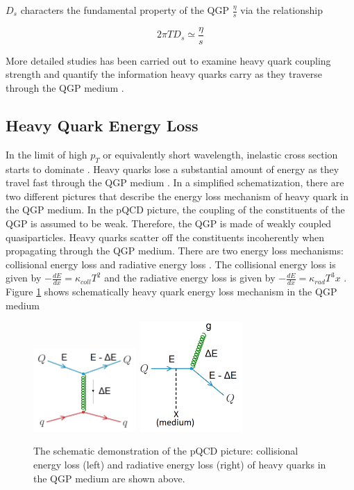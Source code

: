 $D_s$ characters the fundamental property of the QGP $\frac{\eta}{s}$ via the relationship 

\begin{equation}
2 \pi T D_s \simeq \frac{\eta}{s}
\end{equation}

More detailed studies has been carried out to examine heavy quark coupling strength and quantify the information heavy quarks carry as they traverse through the QGP medium \cite{HQJamie}.


\subsection{Heavy Quark Energy Loss}

In the limit of high $p_T$ or equivalently short wavelength, inelastic cross section starts to dominate \cite{}. Heavy quarks lose a substantial amount of energy as they travel fast through the QGP medium \cite{HQELossFirst}. In a simplified schematization, there are two different pictures that describe the energy loss mechanism of heavy quark in the QGP medium. In the pQCD picture, the coupling of the constituents of the QGP is assumed to be weak. Therefore, the QGP is made of weakly coupled quasiparticles. Heavy quarks scatter off the constituents incoherently when propagating through the QGP medium. There are two energy loss mechanisms: collisional energy loss and radiative energy loss \cite{HQRaff}. The collisional energy loss is given by $-\frac{dE}{dx} = \kappa_{coll}T^2$ and the radiative energy loss is given by  $-\frac{dE}{dx} = \kappa_{rad}T^3x$ \cite{HQCollELoss,HQRadELoss}. Figure \ref{HQELosspQCD} shows schematically heavy quark energy loss mechanism in the QGP medium



 \begin{figure}[hbtp]
\begin{center}
\includegraphics[width=0.35\textwidth]{Figures/Chapter1/Collisional.png}
\includegraphics[width=0.35\textwidth]{Figures/Chapter1/Radiative.png}
\caption{The schematic demonstration of the pQCD picture: collisional energy loss (left) and radiative energy loss (right) of heavy quarks in the QGP medium are shown above.}
\label{HQELosspQCD}
\end{center}
\end{figure}   

